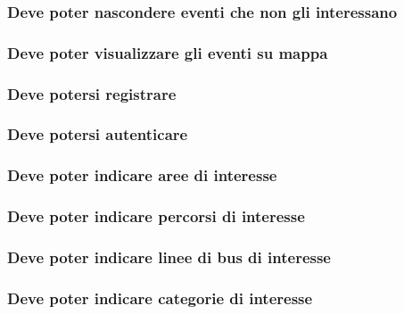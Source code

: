 \documentclass{article}
\begin{document}
\subsubsection{Deve poter nascondere eventi che non gli interessano}

\subsubsection{Deve poter visualizzare gli eventi su mappa}

\subsubsection{Deve potersi registrare}

\subsubsection{Deve potersi autenticare}

\subsubsection{Deve poter indicare aree di interesse}

\subsubsection{Deve poter indicare percorsi di interesse}

\subsubsection{Deve poter indicare linee di bus di interesse}

\subsubsection{Deve poter indicare categorie di interesse}
\end{document}
